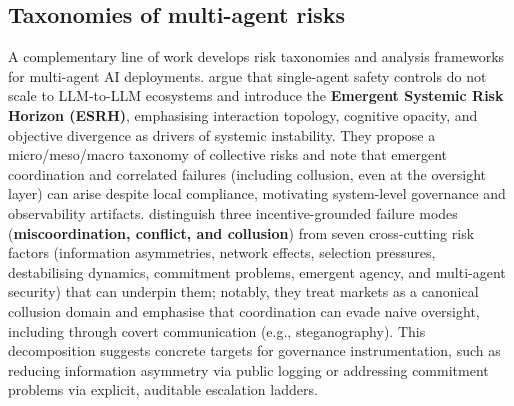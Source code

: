 \documentclass[11pt, a4paper]{article}
\begin{document}
\subsection{Taxonomies of multi-agent risks}

A complementary line of work develops risk taxonomies and analysis frameworks for multi-agent AI deployments. \citet{Bisconti2025BeyondSingleAgentSafety} argue that single-agent safety controls do not scale to LLM-to-LLM ecosystems and introduce the \textbf{Emergent Systemic Risk Horizon (ESRH)}, emphasising interaction topology, cognitive opacity, and objective divergence as drivers of systemic instability. They propose a micro/meso/macro taxonomy of collective risks and note that emergent coordination and correlated failures (including collusion, even at the oversight layer) can arise despite local compliance, motivating system-level governance and observability artifacts. \citet{Hammond2025MultiAgentRisks} distinguish three incentive-grounded failure modes (\textbf{miscoordination, conflict, and collusion}) from seven cross-cutting risk factors (information asymmetries, network effects, selection pressures, destabilising dynamics, commitment problems, emergent agency, and multi-agent security) that can underpin them; notably, they treat markets as a canonical collusion domain and emphasise that coordination can evade naive oversight, including through covert communication (e.g., steganography). This decomposition suggests concrete targets for governance instrumentation, such as reducing information asymmetry via public logging or addressing commitment problems via explicit, auditable escalation ladders.
\end{document}
